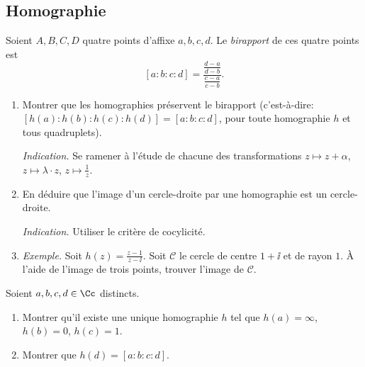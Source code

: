 \documentclass[11pt,class=report,crop=false]{standalone}
\begin{document}
\subsection{Homographie}

\begin{exercicecours}

Soient $A, B, C, D$ quatre points d'affixe $a,b,c,d$.
Le \emph{birapport} de ces quatre points est 
$$[a:b:c:d] = \frac{\frac{d-a}{d-b}}{\frac{c-a}{c-b}}.$$

\begin{enumerate}
 \item Montrer que les homographies préservent le birapport (c'est-à-dire:
 $[h(a):h(b):h(c):h(d)]=[a:b:c:d]$, pour toute homographie $h$ et tous quadruplets).
 
 \emph{Indication.} Se ramener à l'étude de chacune des transformations $z \mapsto z+\alpha$,
 $z \mapsto \lambda \cdot z$, $z \mapsto \frac{1}{z}$.
 
 \item En déduire que l'image d'un cercle-droite par une homographie est un cercle-droite.
 
  \emph{Indication.} Utiliser le critère de cocylicité.
 
 \item \emph{Exemple.} Soit $h(z) = \frac{z-1}{z-\ii}$. Soit $\mathcal{C}$
 le cercle de centre $1 + \ii$ et de rayon $1$. 
 \`A l'aide de l'image de trois points, trouver l'image de $\mathcal{C}$.
 
\end{enumerate}
\end{exercicecours}


\begin{exercicecours}
Soient $a,b,c,d \in \Cc$ distincts.
\begin{enumerate}
 \item Montrer qu'il existe une unique homographie $h$ tel que $h(a)=\infty$, $h(b)=0$,
 $h(c)=1$. 
 
 \item Montrer que $h(d) = [a:b:c:d]$.
\end{enumerate}
\end{exercicecours}
\end{document}
